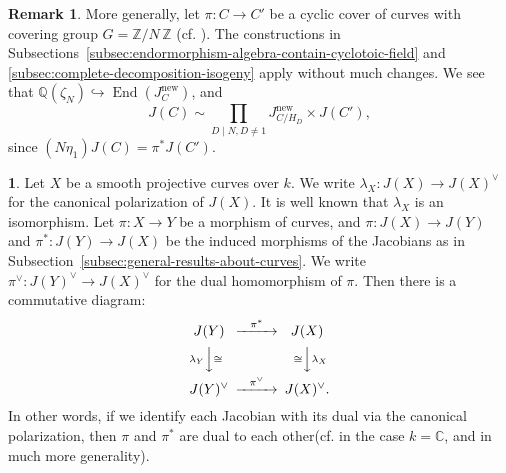 \documentclass{amsart}[11pt]
\theoremstyle{definition}
\newtheorem{rem}[thm]{Remark}
\newtheorem{sect}[thm]{}
\numberwithin{equation}{section}
\theoremstyle{notitle}
\begin{document}
\begin{rem}
  More generally, let $\pi: C \to C'$ be a cyclic cover of curves with
  covering group $G={\mathbb{Z}/ {N}\, \mathbb{Z}}$ (cf. \cite[Definition
  5.1]{MR1708603}). The constructions in
  Subsections~\ref{subsec:endormorphism-algebra-contain-cyclotoic-field}
  and \ref{subsec:complete-decomposition-isogeny} apply without much
  changes.  We see that ${\mathbb{Q}}(\zeta_N)\hookrightarrow\operatorname{End}(J_C^{\mathrm{new}}) $,
  and
\[ J(C)\sim \prod_{D\mid N, D\neq 1}J_{C/H_D}^{\mathrm{new}} \times J(C'), \]
since $(N\eta_1)J(C)=\pi^*J(C')$. 
\end{rem}
\begin{sect}
  Let $X$ be a smooth projective curves over $k$. We write $\lambda_X:
  J(X)\to J(X)^\vee$ for the canonical polarization of $J(X)$. It is
  well known that $\lambda_X$ is an isomorphism. Let $\pi: X\to Y$ be
  a morphism of curves, and $\pi: J(X)\to J(Y)$ and $\pi^*: J(Y)\to
  J(X)$ be the induced morphisms of the Jacobians as in
  Subsection~\ref{subsec:general-results-about-curves}. We write
  $\pi^\vee: J(Y)^\vee \to J(X)^\vee$ for the dual homomorphism of
  $\pi$. Then there is a commutative diagram:
  \begin{equation}
    \label{eq:CD-polarization}
    \begin{CD}
    J(Y)@>{\pi^*}>> J(X)\\
    @V{\lambda_Y}V{\cong}V @V{\cong}V{\lambda_X}V\\
    J(Y)^\vee @>{\pi^\vee}>> J(X)^\vee.
    \end{CD}
  \end{equation}
In other words, if we identify each Jacobian with its dual via the
canonical polarization, then $\pi$ and $\pi^*$ are dual to each
other(cf. \cite[Prop.11.11.6]{MR2062673} in the case $k={\mathbb{C}}$, and
\cite[Prop A.6]{MR2987306} in much more generality).  
\end{sect}
\end{document}
